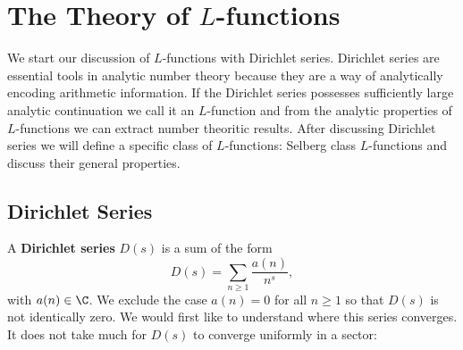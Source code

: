 \chapter{The Theory of \texorpdfstring{$L$}{L}-functions}
  We start our discussion of $L$-functions with Dirichlet series. Dirichlet series are essential tools in analytic number theory because they are a way of analytically encoding arithmetic information. If the Dirichlet series possesses sufficiently large analytic continuation we call it an $L$-function and from the analytic properties of $L$-functions we can extract number theoritic results. After discussing Dirichlet series we will define a specific class of $L$-functions: Selberg class $L$-functions and discuss their general properties.
    \section{Dirichlet Series}
      A \textbf{Dirichlet series} $D(s)$ is a sum of the form
      \[
        D(s) = \sum_{n \ge 1}\frac{a(n)}{n^{s}},
      \]
      with $a(n) \in \C$. We exclude the case $a(n) = 0$ for all $n \ge 1$ so that $D(s)$ is not identically zero. We would first like to understand where this series converges. It does not take much for $D(s)$ to converge uniformly in a sector:

